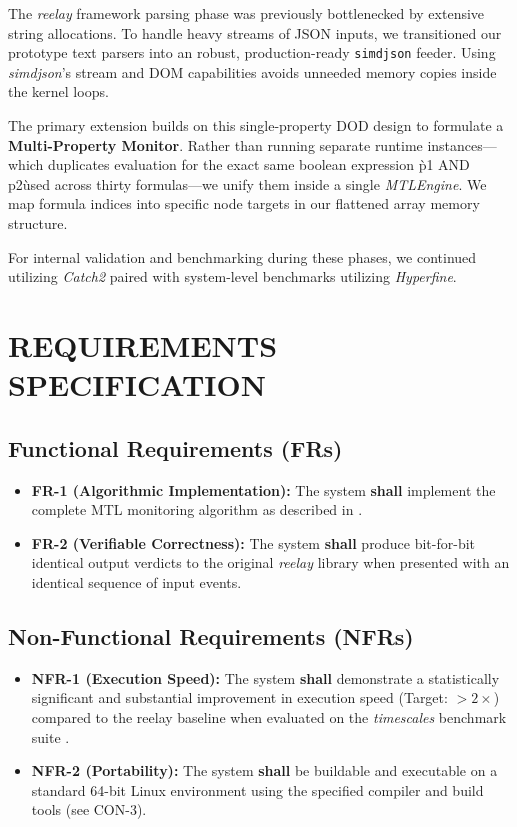 \documentclass[a4paper,12pt]{report}
\begin{document}
The \textit{reelay} framework parsing phase was previously bottlenecked by extensive string allocations. To handle heavy streams of JSON inputs, we transitioned our prototype text parsers into an robust, production-ready \texttt{simdjson} feeder. Using \textit{simdjson}'s stream and DOM capabilities avoids unneeded memory copies inside the kernel loops.

The primary extension builds on this single-property DOD design to formulate a \textbf{Multi-Property Monitor}. Rather than running separate runtime instances—which duplicates evaluation for the exact same boolean expression \`p1 AND p2\` used across thirty formulas—we unify them inside a single \textit{MTLEngine}. We map formula indices into specific node targets in our flattened array memory structure. 

For internal validation and benchmarking during these phases, we continued utilizing \textit{Catch2} paired with system-level benchmarks utilizing \textit{Hyperfine}.

\chapter{REQUIREMENTS SPECIFICATION}

\section{Functional Requirements (FRs)}

\begin{itemize}
\item \textbf{FR-1 (Algorithmic Implementation):} The system \textbf{shall} implement the complete MTL monitoring algorithm as described in \cite{Ulus19}.


\item \textbf{FR-2 (Verifiable Correctness):} The system \textbf{shall} produce bit-for-bit identical output verdicts to the original \textit{reelay} library when presented with an identical sequence of input events.
\end{itemize}

\section{Non-Functional Requirements (NFRs)}


\begin{itemize}
\item \textbf{NFR-1 (Execution Speed):} The system \textbf{shall} demonstrate a statistically significant and substantial improvement in execution speed (Target: $> 2\times$) compared to the reelay baseline when evaluated on the \textit{timescales} benchmark suite \cite{ulus2019timescales}.

\item \textbf{NFR-2 (Portability):} The system \textbf{shall} be buildable and executable on a standard 64-bit Linux environment using the specified compiler and build tools (see CON-3).
\end{itemize}
\end{document}
